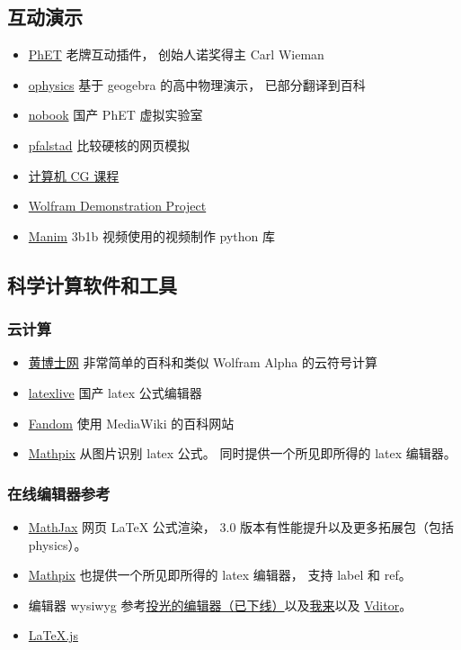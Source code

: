 \subsection{互动演示}
\begin{itemize}
\item \href{https://phet.colorado.edu}{PhET} 老牌互动插件， 创始人诺奖得主 Carl Wieman
\item \href{https://ophysics.com}{ophysics} 基于 geogebra 的高中物理演示， 已部分翻译到百科
\item \href{https://www.nobook.com}{nobook} 国产 PhET 虚拟实验室
\item \href{https://www.falstad.com}{pfalstad} 比较硬核的网页模拟
\item \href{http://www.cs.cornell.edu/courses/cs5643/2010sp}{计算机 CG 课程}
\item \href{https://demonstrations.wolfram.com/topics.php?PhysicalSciences#5}{Wolfram Demonstration Project}
\item \href{https://github.com/3b1b/manim}{Manim} 3b1b 视频使用的视频制作 python 库
\end{itemize}

\subsection{科学计算软件和工具}
\subsubsection{云计算}
\begin{itemize}
\item \href{http://www.drhuang.com}{黄博士网} 非常简单的百科和类似 Wolfram Alpha 的云符号计算
\item \href{https://www.latexlive.com}{latexlive} 国产 latex 公式编辑器
\item \href{https://harrypotter.fandom.com}{Fandom} 使用 MediaWiki 的百科网站
\item \href{https://mathpix.com}{Mathpix} 从图片识别 latex 公式。 同时提供一个所见即所得的 latex 编辑器。
\end{itemize}

\subsubsection{在线编辑器参考}
\begin{itemize}
\item \href{https://www.mathjax.org}{MathJax} 网页 LaTeX 公式渲染， 3.0 版本有性能提升以及更多拓展包（包括 physics）。
\item \href{https://mathpix.com/ocr?gclid=CjwKCAiAy_CcBhBeEiwAcoMRHKnSPGjROmFGBj5R_Ev3hke7lG7xNIzKDHv5FgkMFq62aXRpISt_LhoC47YQAvD_BwE}{Mathpix} 也提供一个所见即所得的 latex 编辑器， 支持 label 和 ref。
\item 编辑器 wysiwyg 参考\href{https://editoe.com}{投光的编辑器（已下线）}以及\href{https://www.wolai.com}{我来}以及 \href{https://github.com/Vanessa219/vditor}{Vditor}。
\item \href{https://github.com/michael-brade/LaTeX.js}{LaTeX.js}
\end{itemize}
